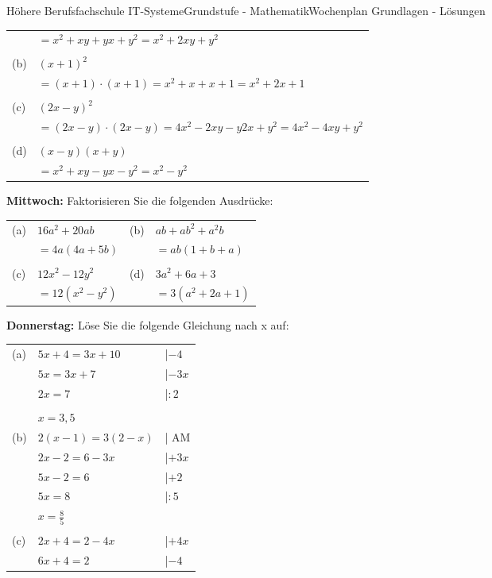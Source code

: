 \documentclass[oneside,openany,headings=optiontotoc,11pt,numbers=noenddot]{scrreprt}
\begin{document}
\begin{worksheet}{Höhere Berufsfachschule IT-Systeme}{Grundstufe - Mathematik}{Wochenplan Grundlagen - Lösungen}
\begin{framed}
\begin{tabularx}{\textwidth}{lX}
				& \(= x^2 +xy + yx + y^2 = x^2 +2xy + y^2\)\\\\
				(b) & \((x+1)^2\)\\
				& \(= (x+1)\cdot(x+1) = x^2 +x + x + 1 = x^2 +2x +1\)\\\\
				(c) & \((2x-y)^2\)\\
				& \(= (2x-y)\cdot(2x-y) = 4x^2 -2xy - y2x + y^2 = 4x^2 -4xy + y^2\)\\\\
				(d) & \((x-y)(x+y)\)\\
				& \(= x^2 +xy -yx -y^2 = x^2 -y^2\)
			\end{tabularx}
		\end{framed}
		\begin{framed}
			\noindent
			\textbf{Mittwoch:} Faktorisieren Sie die folgenden Ausdrücke:\\
			\begin{tabularx}{\textwidth}{lXlX}
				(a) & \(16a^2 +20ab\) & (b) & \(ab +ab^2+a^2b\)\\
				& \(= 4a(4a +5b)\) & & \(= ab(1+b+a)\)\\\\
				(c) & \(12x^2-12y^2\) & (d) & \(3a^2+6a+3\)\\
				& \(= 12(x^2 - y^2)\) & & \(= 3(a^2 +2a+1)\)
			\end{tabularx}
		\end{framed}
		\begin{framed}
			\noindent
			\textbf{Donnerstag:} Löse Sie die folgende Gleichung nach x auf:\\
			\begin{tabularx}{\textwidth}{lll}
				(a) & \(5x+4=3x+10\) & |\(-4\)\\
				& \(5x = 3x + 7\) & |\(-3x\)\\
				& \(2x = 7\) & |\(:2\)\\\\
				& \(x = 3,5\)\\
				(b) & \(2(x-1)=3(2-x)\) & | AM\\
				& \(2x - 2 = 6 -3x \) & |\(+3x\)\\
				& \(5x -2 = 6\) & |\(+2\)\\
				& \(5x = 8\) & |\(:5\)\\
				& \(x = \frac{8}{5}\)\\\\
				(c) & \(2x+4 = 2-4x\) & |\(+4x\)\\
				& \(6x+4 = 2\) & |\(-4\)\\

\end{tabularx}
\end{framed}
\end{worksheet}
\end{document}
